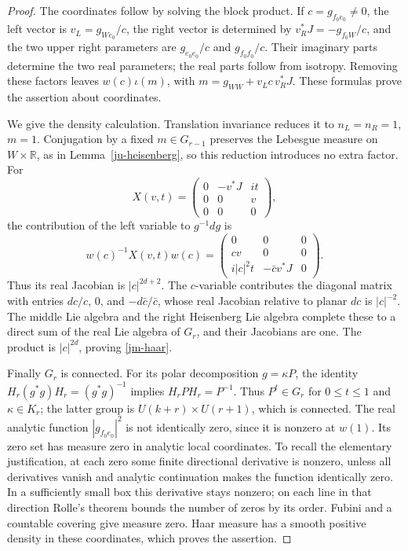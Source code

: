 \begin{proof}
The coordinates follow by solving the block product.
If \(c=g_{f_0e_0}\ne0\), the left vector is
\(v_L=g_{We_0}/c\), the right vector is determined by
\(v_R^*J=-g_{f_0W}/c\), and the two upper right parameters
are \(g_{e_0e_0}/c\) and \(g_{f_0f_0}/c\).
Their imaginary parts determine the two real parameters;
the real parts follow from isotropy.
Removing these factors leaves \(w(c)\iota(m)\), with
\(m=g_{WW}+v_Lc\,v_R^*J\).
These formulas prove the assertion about coordinates.

We give the density calculation.  Translation invariance
reduces it to \(n_L=n_R=1\), \(m=1\).
Conjugation by a fixed \(m\in G_{r-1}\) preserves the
Lebesgue measure on \(W\times\mathbb R\), as in
Lemma~\ref{ju-heisenberg}, so this reduction introduces no
extra factor.
For
\[
 X(v,t)=\begin{pmatrix}0&-v^*J&it\\0&0&v\\0&0&0\end{pmatrix},
\]
the contribution of the left variable to \(g^{-1}dg\) is
\[
 w(c)^{-1}X(v,t)w(c)=
 \begin{pmatrix}
 0&0&0\\cv&0&0\\i|c|^2t&-\bar c v^*J&0
 \end{pmatrix}.
\]
Thus its real Jacobian is \(|c|^{2d+2}\).
The \(c\)-variable contributes the diagonal matrix with entries
\(dc/c\), \(0\), and \(-d\bar c/\bar c\), whose real Jacobian
relative to planar \(dc\) is \(|c|^{-2}\).
The middle Lie algebra and the right Heisenberg Lie algebra
complete these to a direct sum of the real Lie algebra of
\(G_r\), and their Jacobians are one.
The product is \(|c|^{2d}\), proving \eqref{jm-haar}.

Finally \(G_r\) is connected.
For its polar decomposition \(g=\kappa P\), the identity
\(H_r(g^*g)H_r=(g^*g)^{-1}\) implies
\(H_rPH_r=P^{-1}\).  Thus \(P^t\in G_r\) for \(0\leq t\leq1\)
and \(\kappa\in K_r\); the latter group is
\(U(k+r)\times U(r+1)\), which is connected.
The real analytic function \(|g_{f_0e_0}|^2\) is not
identically zero, since it is nonzero at \(w(1)\).
Its zero set has measure zero in analytic local coordinates.
To recall the elementary justification, at each zero some
finite directional derivative is nonzero, unless all
derivatives vanish and analytic continuation makes the
function identically zero.  In a sufficiently small box this
derivative stays nonzero; on each line in that direction
Rolle's theorem bounds the number of zeros by its order.
Fubini and a countable covering give measure zero.
Haar measure has a smooth positive density in these coordinates,
which proves the assertion.
\end{proof}

